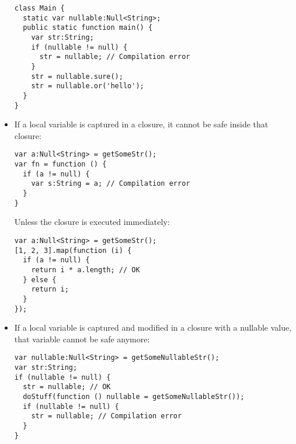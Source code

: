 \begin{itemize}
\begin{lstlisting}
class Main {
  static var nullable:Null<String>;
  public static function main() {
    var str:String;
    if (nullable != null) {
      str = nullable; // Compilation error
    }
    str = nullable.sure();
    str = nullable.or('hello');
  }
}
\end{lstlisting}
    \item If a local variable is captured in a closure, it cannot be safe inside that closure:
    \begin{lstlisting}
var a:Null<String> = getSomeStr();
var fn = function () {
  if (a != null) {
    var s:String = a; // Compilation error
  }
}
\end{lstlisting}
    Unless the closure is executed immediately:
    \begin{lstlisting}
var a:Null<String> = getSomeStr();
[1, 2, 3].map(function (i) {
  if (a != null) {
    return i * a.length; // OK
  } else {
    return i;
  }
});
\end{lstlisting}
    \item If a local variable is captured and modified in a closure with a nullable value, that variable cannot be safe anymore:
    \begin{lstlisting}
var nullable:Null<String> = getSomeNullableStr();
var str:String;
if (nullable != null) {
  str = nullable; // OK
  doStuff(function () nullable = getSomeNullableStr());
  if (nullable != null) {
    str = nullable; // Compilation error
  }
}
\end{lstlisting}
\end{itemize}

